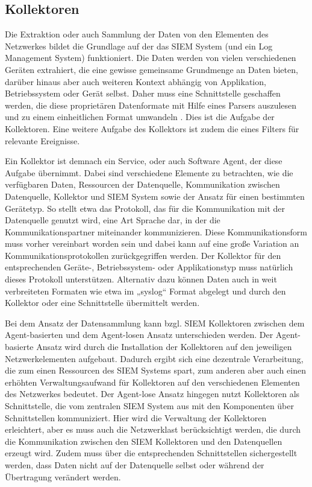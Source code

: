 \subsection{Kollektoren}
Die Extraktion oder auch Sammlung der Daten von den Elementen des Netzwerkes bildet die Grundlage auf der das SIEM System (und ein Log Management System) funktioniert. Die Daten werden von vielen verschiedenen Geräten extrahiert, die eine gewisse gemeinsame Grundmenge an Daten bieten, darüber hinaus aber auch weiteren Kontext abhängig von Applikation, Betriebssystem oder Gerät selbst. Daher muss eine Schnittstelle geschaffen werden, die diese proprietären Datenformate mit Hilfe eines Parsers auszulesen und zu einem einheitlichen Format umwandeln \citep{AV1}.
Dies ist die Aufgabe der Kollektoren. Eine weitere Aufgabe des Kollektors ist zudem die eines Filters für relevante Ereignisse. 

Ein Kollektor ist demnach ein Service, oder auch Software Agent, der diese Aufgabe übernimmt. Dabei sind verschiedene Elemente zu betrachten, wie die verfügbaren Daten, Ressourcen der Datenquelle, Kommunikation zwischen Datenquelle, Kollektor und SIEM System sowie der Ansatz für einen bestimmten Gerätetyp. So stellt etwa das Protokoll, das für die Kommunikation mit der Datenquelle genutzt wird, eine Art Sprache dar, in der die Kommunikationspartner miteinander kommunizieren. Diese Kommunikationsform muss vorher vereinbart worden sein und dabei kann auf eine große Variation an Kommunikationsprotokollen zurückgegriffen werden. Der Kollektor für den entsprechenden Geräte-, Betriebssystem- oder Applikationstyp muss natürlich dieses Protokoll unterstützen. Alternativ dazu können Daten auch in weit verbreiteten Formaten wie etwa im „syslog“ Format abgelegt und durch den Kollektor oder eine Schnittstelle übermittelt werden.

Bei dem Ansatz der Datensammlung kann bzgl. SIEM Kollektoren zwischen dem Agent-basierten und dem Agent-losen Ansatz unterschieden werden. Der Agent-basierte Ansatz wird durch die Installation der Kollektoren auf den jeweiligen Netzwerkelementen aufgebaut. Dadurch ergibt sich eine dezentrale Verarbeitung, die zum einen Ressourcen des SIEM Systems spart, zum anderen aber auch einen erhöhten Verwaltungsaufwand für Kollektoren auf den verschiedenen Elementen des Netzwerkes bedeutet. Der Agent-lose Ansatz hingegen nutzt Kollektoren als Schnittstelle, die vom zentralen SIEM System aus mit den Komponenten über Schnittstellen kommuniziert. Hier wird die Verwaltung der Kollektoren erleichtert, aber es muss auch die Netzwerklast berücksichtigt werden, die durch die Kommunikation zwischen den SIEM Kollektoren und den Datenquellen erzeugt wird. Zudem muss über die entsprechenden Schnittstellen sichergestellt werden, dass Daten nicht auf der Datenquelle selbst oder während der Übertragung verändert werden.

